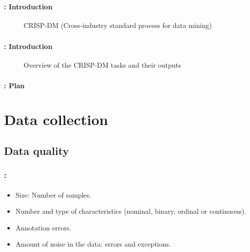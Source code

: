 \documentclass[xcolor=table]{beamer}
\subtitle[Data \& eval]{Data preparation and models' evaluation}
\begin{document}
	
\begin{frame}
	\frametitle{\inserttitle}
	\framesubtitle{\insertshortsubtitle: Introduction}
	
	\begin{figure}
		\centering
		\caption{CRISP-DM (Cross-industry standard process for data mining)}
	\end{figure}
	
\end{frame}

\begin{frame}
	\frametitle{\inserttitle}
	\framesubtitle{\insertshortsubtitle: Introduction}
	
	\begin{figure}
		\centering
		\caption{Overview of the CRISP-DM tasks and their outputs \cite{2000-wirth-hipp}}
	\end{figure}
	
\end{frame}


\begin{frame}
	\frametitle{\inserttitle}
	\framesubtitle{\insertshortsubtitle: Plan}
	
	\begin{multicols}{2}
		\tableofcontents
	\end{multicols}
\end{frame}

\section{Data collection}

\begin{frame}
	\frametitle{\insertshortsubtitle}
	\framesubtitle{\insertsection}
	
	
\end{frame}

\subsection{Data quality}

\begin{frame}
	\frametitle{\insertshortsubtitle: \insertsection}
	\framesubtitle{\insertsubsection}
	
	\begin{itemize}
		\item Size: Number of samples.
		\item Number and type of characteristics (nominal, binary, ordinal or continuous).
		\item Annotation errors.
		\item Amount of noise in the data: errors and exceptions.
	\end{itemize}

\end{frame}
\end{document}
